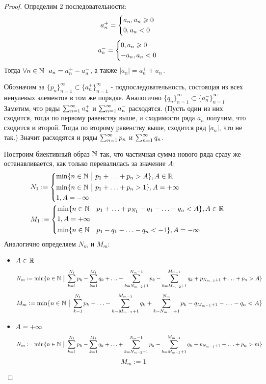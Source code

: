 \begin{proof}
	Определим 2 последовательности:
	\[
		a^+_n = \left\{\begin{aligned}
			&{a_n, a_n \geqslant 0}
			\\
			&{0, a_n < 0}
		\end{aligned}\right.
	\]
	\[
		a^-_n = \left\{\begin{aligned}
			&{0, a_n \geqslant 0}
			\\
			&{-a_n, a_n < 0}
		\end{aligned}\right.
	\]
	Тогда $\forall n \in \N\ \ a_n = a^+_n - a^-_n$, а также $|a_n| = a^+_n + a^-_n$.
	
	Обозначим за $\{p_n\}_{n = 1}^\infty \subset \{a^+_n\}_{n = 1}^\infty$ - подпоследовательность, состоящая из всех ненулевых элементов в том же порядке. Аналогично $\{q_n\}_{n = 1}^\infty \subset \{a^-_n\}_{n = 1}^\infty$. Заметим, что ряды $\sum_{n = 1}^\infty a^+_n$ и $\sum_{n = 1}^\infty a^-_n$ расходятся. (Пусть один из них сходится, тогда по первому равенству выше, и сходимости ряда $a_n$ получим, что сходится и второй. Тогда по второму равенству выше, сходится ряд $|a_n|$, что не так.) Значит расходятся и ряды $\sum_{n = 1}^\infty p_n$ и $\sum_{n = 1}^\infty q_n$.
	
	Построим биективный образ $\mathbb{N}$ так, что частичная сумма нового ряда сразу же останавливается, как только перевалилась за значение $A$:
	\begin{align*}
		&{N_1 := \left\{\begin{aligned}
			&{\min \{n \in \mathbb{N} \ \big|\  p_1 + \ldots + p_n > A\}, A \in \mathbb{R}}
			\\
			&{\min \{n \in \mathbb{N} \ \big|\  p_1 + \ldots + p_n > 1\}, A = +\infty}
			\\
			&{1, A = -\infty}
		\end{aligned}\right.}
		\\
		&{M_1 := \left\{\begin{aligned}
				&{\min \{n \in \mathbb{N} \ \big|\  p_1 + \ldots + p_{N_1} - q_1 - \ldots - q_n < A\}, A \in \mathbb{R}}
				\\
				&{1, A = +\infty}
				\\
				&{\min \{n \in \mathbb{N} \ \big|\  p_1 - q_1 - \ldots - q_n < -1\}, A = -\infty}
		\end{aligned}\right.}
	\end{align*}
	Аналогично определяем $N_m$ и $M_m$:
	\begin{itemize}
		\item $A \in \mathbb{R}$
		\[
			N_m := \min \{n \in \mathbb{N} \ \big|\  \sum\limits_{k = 1}^{N_1} p_k - \sum\limits_{k = 1}^{M_1} q_k + \ldots + \sum\limits_{k = N_{m - 2} + 1}^{N_m - 1} p_k - \sum\limits_{k = M_{m - 2} + 1}^{M_{m - 1}} q_k + p_{N_{m - 1} + 1} + \ldots + p_n > A\}
		\]
		\[
			M_m := \min \{n \in \mathbb{N} \ \big|\  \sum\limits_{k = 1}^{N_1} p_k - \ldots - \sum\limits_{k = M_{m - 2} + 1}^{M_{m - 1}} q_k + \sum\limits_{k = N_{m - 1} + 1}^{N_m} p_k - q_{M_{m - 1} + 1} - \ldots - q_n < A\}
		\]
		
		\item $A = +\infty$
		\[
		N_m := \min \{n \in \mathbb{N} \ \big|\  \sum\limits_{k = 1}^{N_1} p_k - \sum\limits_{k = 1}^{M_1} q_k + \ldots + \sum\limits_{k = N_{m - 2} + 1}^{N_m - 1} p_k - \sum\limits_{k = M_{m - 2} + 1}^{M_{m - 1}} q_k + p_{N_{m - 1} + 1} + \ldots + p_n > m\}
		\]
		\[
		M_m := 1
		\]
		

\end{itemize}
\end{proof}
